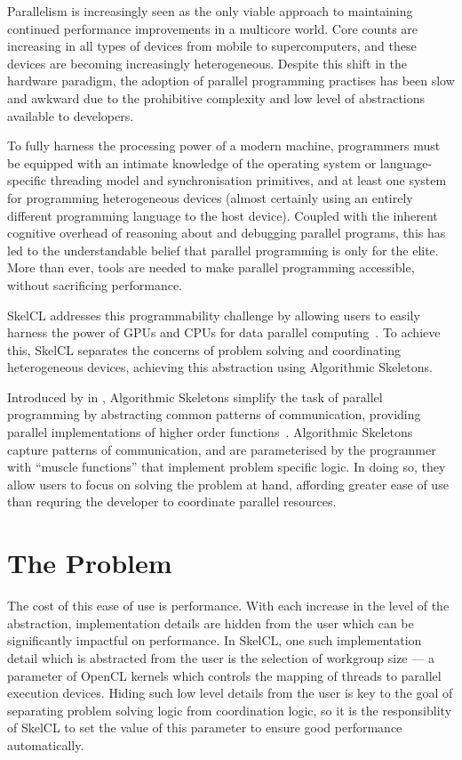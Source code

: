 Parallelism is increasingly seen as the only viable approach to
maintaining continued performance improvements in a multicore
world. Core counts are increasing in all types of devices from mobile
to supercomputers, and these devices are becoming increasingly
heterogeneous. Despite this shift in the hardware paradigm, the
adoption of parallel programming practises has been slow and awkward
due to the prohibitive complexity and low level of abstractions
available to developers.

To fully harness the processing power of a modern machine, programmers
must be equipped with an intimate knowledge of the operating system or
language-specific threading model and synchronisation primitives, and
at least one system for programming heterogeneous devices (almost
certainly using an entirely different programming language to the host
device). Coupled with the inherent cognitive overhead of reasoning
about and debugging parallel programs, this has led to the
understandable belief that parallel programming is only for the
elite. More than ever, tools are needed to make parallel programming
accessible, without sacrificing performance.

SkelCL addresses this programmability challenge by allowing users to
easily harness the power of GPUs and CPUs for data parallel
computing~\cite{Steuwer2011}. To achieve this, SkelCL separates the
concerns of problem solving and coordinating heterogeneous devices,
achieving this abstraction using Algorithmic Skeletons.

Introduced by \citeauthor{Cole1989} in \citeyear{Cole1989},
Algorithmic Skeletons simplify the task of parallel programming by
abstracting common patterns of communication, providing parallel
implementations of higher order functions~\cite{Cole1989}. Algorithmic
Skeletons capture patterns of communication, and are parameterised by
the programmer with ``muscle functions'' that implement problem
specific logic. In doing so, they allow users to focus on solving the
problem at hand, affording greater ease of use than requring the
developer to coordinate parallel resources.


\section{The Problem}

The cost of this ease of use is performance. With each increase in the
level of the abstraction, implementation details are hidden from the
user which can be significantly impactful on performance. In SkelCL,
one such implementation detail which is abstracted from the user is
the selection of workgroup size --- a parameter of OpenCL kernels
which controls the mapping of threads to parallel execution
devices. Hiding such low level details from the user is key to the
goal of separating problem solving logic from coordination logic, so
it is the responsiblity of SkelCL to set the value of this parameter
to ensure good performance automatically.

